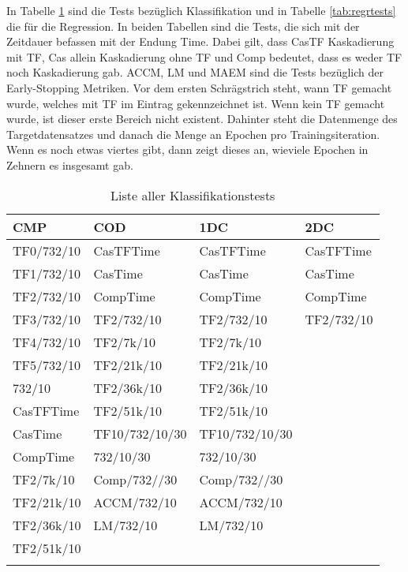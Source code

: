 In Tabelle \ref{tab:classtests} sind die Tests bezüglich Klassifikation und in Tabelle \ref{tab:regrtests} die für die Regression. 
In beiden Tabellen sind die Tests, die sich mit der Zeitdauer befassen mit der Endung Time. Dabei gilt, dass CasTF Kaskadierung mit TF, Cas allein 
Kaskadierung ohne TF und Comp bedeutet, dass es weder TF noch Kaskadierung gab. ACCM, LM und MAEM sind die Tests bezüglich der Early-Stopping 
Metriken. 
Vor dem ersten Schrägstrich steht, wann TF gemacht wurde, welches mit TF im Eintrag gekennzeichnet ist. Wenn kein TF gemacht wurde, ist dieser 
erste Bereich nicht existent. Dahinter steht die Datenmenge 
des Targetdatensatzes und danach die Menge an Epochen pro Trainingsiteration. Wenn es noch etwas viertes gibt, dann zeigt dieses an, wieviele 
Epochen in Zehnern es insgesamt gab. 

\begin{table}[!ht]
    \centering
    \begin{tabular}{l|l|l|l}
        \textbf{CMP} & \textbf{COD} & \textbf{1DC} & \textbf{2DC} \\
        \hline
        TF0/732/10 & CasTFTime & CasTFTime & CasTFTime \\
        TF1/732/10 & CasTime & CasTime & CasTime \\
        TF2/732/10 & CompTime & CompTime & CompTime \\
        TF3/732/10 & TF2/732/10 & TF2/732/10 & TF2/732/10 \\
        TF4/732/10 & TF2/7k/10 & TF2/7k/10 & \\
        TF5/732/10 & TF2/21k/10 & TF2/21k/10 & \\
        732/10 & TF2/36k/10 & TF2/36k/10 & \\
        CasTFTime & TF2/51k/10 & TF2/51k/10 & \\
        CasTime & TF10/732/10/30 & TF10/732/10/30 & \\
        CompTime & 732/10/30 & 732/10/30 & \\
        TF2/7k/10 & Comp/732//30 & Comp/732//30 & \\
        TF2/21k/10 & ACCM/732/10 & ACCM/732/10 & \\
        TF2/36k/10 & LM/732/10 & LM/732/10 & \\
        TF2/51k/10 & & & \\
        & & & \\
    \end{tabular}
    \caption{\label{tab:classtests} Liste aller Klassifikationstests}
\end{table}

